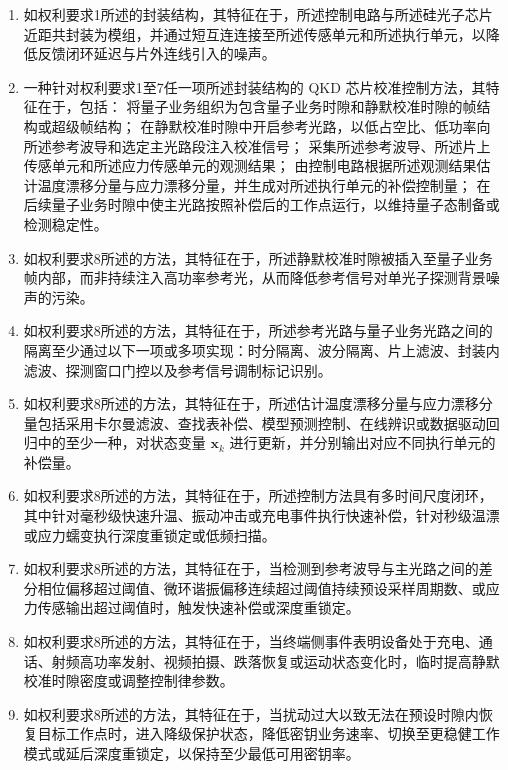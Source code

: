 \documentclass[12pt,a4paper]{article}
\begin{document}
\begin{enumerate}[
    label=\arabic*.,
    leftmargin=0pt,
    itemindent=2em,
    labelsep=0.5em,
    align=left,
    itemsep=0.6em,
    topsep=0pt
]
\item 如权利要求1所述的封装结构，其特征在于，所述控制电路与所述硅光子芯片近距共封装为模组，并通过短互连连接至所述传感单元和所述执行单元，以降低反馈闭环延迟与片外连线引入的噪声。

\item 一种针对权利要求1至7任一项所述封装结构的 QKD 芯片校准控制方法，其特征在于，包括：
将量子业务组织为包含量子业务时隙和静默校准时隙的帧结构或超级帧结构；
在静默校准时隙中开启参考光路，以低占空比、低功率向所述参考波导和选定主光路段注入校准信号；
采集所述参考波导、所述片上传感单元和所述应力传感单元的观测结果；
由控制电路根据所述观测结果估计温度漂移分量与应力漂移分量，并生成对所述执行单元的补偿控制量；
在后续量子业务时隙中使主光路按照补偿后的工作点运行，以维持量子态制备或检测稳定性。

\item 如权利要求8所述的方法，其特征在于，所述静默校准时隙被插入至量子业务帧内部，而非持续注入高功率参考光，从而降低参考信号对单光子探测背景噪声的污染。

\item 如权利要求8所述的方法，其特征在于，所述参考光路与量子业务光路之间的隔离至少通过以下一项或多项实现：时分隔离、波分隔离、片上滤波、封装内滤波、探测窗口门控以及参考信号调制标记识别。

\item 如权利要求8所述的方法，其特征在于，所述估计温度漂移分量与应力漂移分量包括采用卡尔曼滤波、查找表补偿、模型预测控制、在线辨识或数据驱动回归中的至少一种，对状态变量
$\mathbf{x}_k$ 进行更新，并分别输出对应不同执行单元的补偿量。

\item 如权利要求8所述的方法，其特征在于，所述控制方法具有多时间尺度闭环，其中针对毫秒级快速升温、振动冲击或充电事件执行快速补偿，针对秒级温漂或应力蠕变执行深度重锁定或低频扫描。

\item 如权利要求8所述的方法，其特征在于，当检测到参考波导与主光路之间的差分相位偏移超过阈值、微环谐振偏移连续超过阈值持续预设采样周期数、或应力传感输出超过阈值时，触发快速补偿或深度重锁定。

\item 如权利要求8所述的方法，其特征在于，当终端侧事件表明设备处于充电、通话、射频高功率发射、视频拍摄、跌落恢复或运动状态变化时，临时提高静默校准时隙密度或调整控制律参数。

\item 如权利要求8所述的方法，其特征在于，当扰动过大以致无法在预设时隙内恢复目标工作点时，进入降级保护状态，降低密钥业务速率、切换至更稳健工作模式或延后深度重锁定，以保持至少最低可用密钥率。


\end{enumerate}
\end{document}
